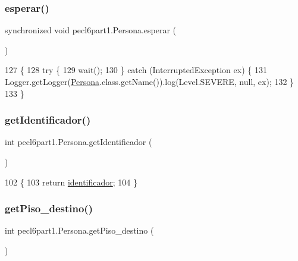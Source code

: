 \subsubsection{\texorpdfstring{esperar()}{esperar()}}
{\footnotesize\ttfamily synchronized void pecl6part1.\+Persona.\+esperar (\begin{DoxyParamCaption}{ }\end{DoxyParamCaption})\hspace{0.3cm}{\ttfamily [inline]}}


\begin{DoxyCode}
127     \{
128         \textcolor{keywordflow}{try} \{
129             wait();
130         \} \textcolor{keywordflow}{catch} (InterruptedException ex) \{
131             Logger.getLogger(\mbox{\hyperlink{classpecl6part1_1_1_persona}{Persona}}.class.getName()).log(Level.SEVERE, null, ex);
132         \}
133     \}
\end{DoxyCode}
\mbox{\label{classpecl6part1_1_1_persona_a9a0fb957aa211a3d4afbe65250a70a82}} 
\subsubsection{\texorpdfstring{get\+Identificador()}{getIdentificador()}}
{\footnotesize\ttfamily int pecl6part1.\+Persona.\+get\+Identificador (\begin{DoxyParamCaption}{ }\end{DoxyParamCaption})\hspace{0.3cm}{\ttfamily [inline]}}


\begin{DoxyCode}
102                                   \{
103         \textcolor{keywordflow}{return} \mbox{\hyperlink{classpecl6part1_1_1_persona_a21697d6304f8709b939317b63daccdcc}{identificador}};
104     \}
\end{DoxyCode}
\mbox{\label{classpecl6part1_1_1_persona_a82e55b6a597ab6cc0aa1d8fcfed9164b}} 
\subsubsection{\texorpdfstring{get\+Piso\+\_\+destino()}{getPiso\_destino()}}
{\footnotesize\ttfamily int pecl6part1.\+Persona.\+get\+Piso\+\_\+destino (\begin{DoxyParamCaption}{ }\end{DoxyParamCaption})\hspace{0.3cm}{\ttfamily [inline]}}


